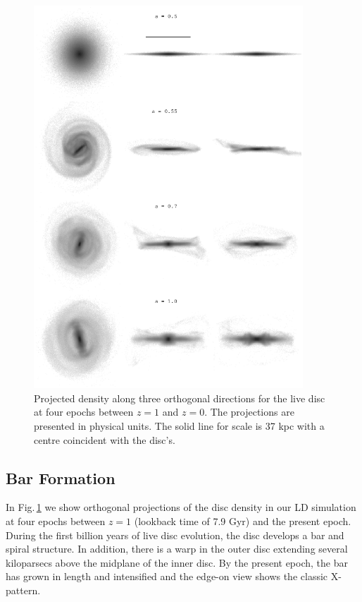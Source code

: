 \begin{figure}
\centering
\includegraphics[width=0.9\textwidth]{../figures/Selected_Density_Panels.eps}
\caption{Projected density along three orthogonal directions for the
  live disc at four epochs between $z=1$ and $z=0$.  The projections are presented
  in physical units. The solid line for scale is
  37 kpc with a centre coincident with the disc's.}
\label{fig:cosmo_density_panels}
\end{figure}

\subsection{Bar Formation}

In Fig.\,\ref{fig:cosmo_density_panels} we show orthogonal projections
of the disc density in our LD simulation at four epochs between
$z=1$ (lookback time of 7.9 Gyr) and the present epoch.
During the first billion years of live disc evolution, the disc
develops a bar and spiral structure.  In addition, there is a
warp in the outer disc extending several kiloparsecs above the midplane
of the inner disc.  By the present epoch, the bar has grown in length and
intensified and the edge-on view shows the classic X-pattern.

